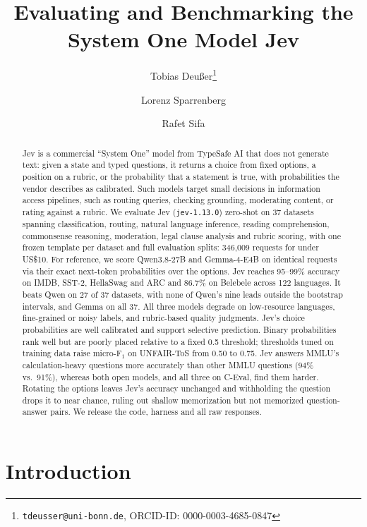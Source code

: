 \documentclass[table]{article}
\title{Evaluating and Benchmarking the System One Model Jev}
\date{}
\author[1,2]{%
	Tobias Deu{\ss}er\thanks{\texttt{tdeusser@uni-bonn.de}, ORCID-ID: 0000-0003-4685-0847}%
}
\author[1,2]{%
	Lorenz Sparrenberg
}
\author[1,2,3]{%
	Rafet Sifa
}
\affil[1]{University of Bonn, Bonn, Germany}
\affil[2]{Lamarr-Institute for Machine Learning and Artificial Intelligence, Bonn, Germany}
\affil[3]{Fraunhofer IAIS, Sankt Augustin, Germany}
\begin{document}
\maketitle
\begin{abstract}
Jev is a commercial ``System One'' model from TypeSafe AI that does not generate text: given a state and typed questions, it returns a choice from fixed options, a position on a rubric, or the probability that a statement is true, with probabilities the vendor describes as calibrated. Such models target small decisions in information access pipelines, such as routing queries, checking grounding, moderating content, or rating against a rubric. We evaluate Jev (\texttt{jev-1.13.0}) zero-shot on 37 datasets spanning classification, routing, natural language inference, reading comprehension, commonsense reasoning, moderation, legal clause analysis and rubric scoring, with one frozen template per dataset and full evaluation splits: 346{,}009 requests for under US\$10. For reference, we score Qwen3.8-27B and Gemma-4-E4B on identical requests via their exact next-token probabilities over the options. Jev reaches 95--99\% accuracy on IMDB, SST-2, HellaSwag and ARC and 86.7\% on Belebele across 122 languages. It beats Qwen on 27 of 37 datasets, with none of Qwen's nine leads outside the bootstrap intervals, and Gemma on all 37. All three models degrade on low-resource languages, fine-grained or noisy labels, and rubric-based quality judgments. Jev's choice probabilities are well calibrated and support selective prediction. Binary probabilities rank well but are poorly placed relative to a fixed 0.5 threshold; thresholds tuned on training data raise micro-F$_\text{1}$ on UNFAIR-ToS from 0.50 to 0.75. Jev answers MMLU's calculation-heavy questions more accurately than other MMLU questions (94\% vs.\ 91\%), whereas both open models, and all three on C-Eval, find them harder. Rotating the options leaves Jev's accuracy unchanged and withholding the question drops it to near chance, ruling out shallow memorization but not memorized question-answer pairs. We release the code, harness and all raw responses.
\end{abstract}




\section{Introduction}
\end{document}
